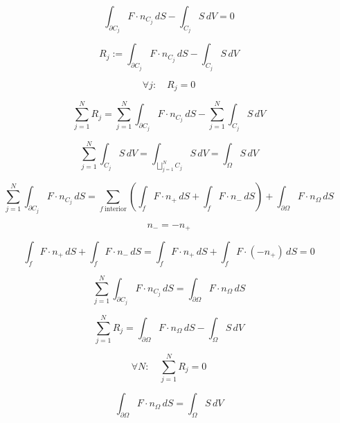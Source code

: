 \documentclass[12pt]{article}
\begin{document}
\begin{equation}
\int_{\partial C_j}F\cdot n_{C_j}\,dS-\int_{C_j}S\,dV=0
\end{equation}

\begin{equation}
R_j:=\int_{\partial C_j}F\cdot n_{C_j}\,dS-\int_{C_j}S\,dV
\end{equation}

\begin{equation}
\forall j:\quad R_j=0
\end{equation}

\begin{equation}
\sum_{j=1}^N R_j=\sum_{j=1}^N\int_{\partial C_j}F\cdot n_{C_j}\,dS-\sum_{j=1}^N\int_{C_j}S\,dV
\end{equation}

\begin{equation}
\sum_{j=1}^N\int_{C_j}S\,dV=\int_{\bigsqcup_{j=1}^N C_j}S\,dV=\int_\Omega S\,dV
\end{equation}

\begin{equation}
\sum_{j=1}^N\int_{\partial C_j}F\cdot n_{C_j}\,dS=\sum_{f\ \mathrm{interior}}\left(\int_f F\cdot n_+\,dS+\int_f F\cdot n_-\,dS\right)+\int_{\partial\Omega}F\cdot n_\Omega\,dS
\end{equation}

\begin{equation}
n_-=-n_+
\end{equation}

\begin{equation}
\int_f F\cdot n_+\,dS+\int_f F\cdot n_-\,dS=\int_f F\cdot n_+\,dS+\int_f F\cdot(-n_+)\,dS=0
\end{equation}

\begin{equation}
\sum_{j=1}^N\int_{\partial C_j}F\cdot n_{C_j}\,dS=\int_{\partial\Omega}F\cdot n_\Omega\,dS
\end{equation}

\begin{equation}
\sum_{j=1}^N R_j=\int_{\partial\Omega}F\cdot n_\Omega\,dS-\int_\Omega S\,dV
\end{equation}

\begin{equation}
\forall N:\quad \sum_{j=1}^N R_j=0
\end{equation}

\begin{equation}
\int_{\partial\Omega}F\cdot n_\Omega\,dS=\int_\Omega S\,dV
\end{equation}
\end{document}
